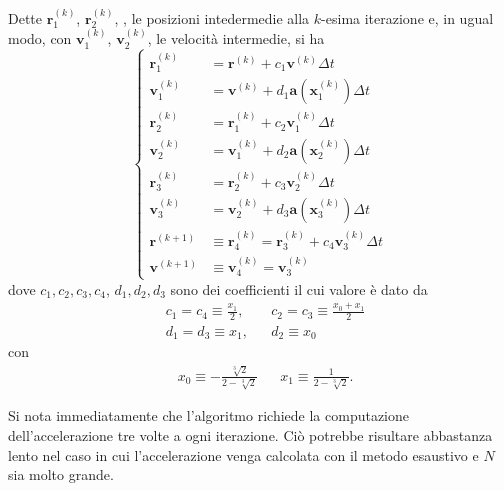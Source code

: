 \documentclass[11pt]{article}
\begin{document}
	\begin{tcolorbox}[breakable,title=Algoritmo di Yoshida (di quarto ordine)]
		Dette $\mathbf{r}^{(k)}_1$, $\mathbf{r}^{(k)}_2$, \textellipsis, le posizioni intedermedie alla $k$-esima iterazione e, in ugual modo, con $\mathbf{v}^{(k)}_1$, $\mathbf{v}^{(k)}_2$, \textellipsis le velocità intermedie, si ha 
		\begin{equation}
			\left\{
			\begin{aligned}
				\mathbf{r}^{(k)}_1 &= \mathbf{r}^{(k)} + c_1\mathbf{v}^{(k)}\Delta t \\
				\mathbf{v}^{(k)}_1 &= \mathbf{v}^{(k)} + d_1 \mathbf{a}(\mathbf{x}^{(k)}_1)\Delta t \\
				\mathbf{r}^{(k)}_2 &= \mathbf{r}^{(k)}_1 + c_2\mathbf{v}^{(k)}_1\Delta t \\
				\mathbf{v}^{(k)}_2 &= \mathbf{v}^{(k)}_1 + d_2 \mathbf{a}(\mathbf{x}^{(k)}_2)\Delta t \\
				\mathbf{r}^{(k)}_3 &= \mathbf{r}^{(k)}_2 + c_3\mathbf{v}^{(k)}_2\Delta t \\
				\mathbf{v}^{(k)}_3 &= \mathbf{v}^{(k)}_2 + d_3 \mathbf{a}(\mathbf{x}^{(k)}_3)\Delta t \\
				\mathbf{r}^{(k + 1)} &\equiv \mathbf{r}^{(k)}_4 = \mathbf{r}^{(k)}_3 + c_4\mathbf{v}^{(k)}_3\Delta t \\
				\mathbf{v}^{(k + 1)} &\equiv \mathbf{v}^{(k)}_4 = \mathbf{v}^{(k)}_3
			\end{aligned}
			\right.
		\end{equation}
		dove $c_1, c_2, c_3, c_4$, $d_1, d_2, d_3$ sono dei coefficienti il cui valore è dato da 
		\begin{equation*}
			\begin{aligned}
				&c_1 = c_4 \equiv \frac{x_1}{2},& &c_2 = c_3 \equiv \frac{x_0 + x_1}{2} \\
				&d_1 = d_3 \equiv x_1, & &d_2 \equiv x_0
			\end{aligned}
		\end{equation*}
		con 
		\begin{equation*}
			\begin{aligned}
				&x_0 \equiv -\frac{\sqrt[3]{2}}{2 - \sqrt[3]{2}} & &x_1 \equiv \frac{1}{2 - \sqrt[3]{2}}.
			\end{aligned}
		\end{equation*}
	\end{tcolorbox}

	Si nota immediatamente che l'algoritmo richiede la computazione dell'accelerazione tre volte a ogni iterazione. Ciò potrebbe risultare abbastanza lento nel caso in cui l'accelerazione venga calcolata con il metodo esaustivo e $N$ sia molto grande.
\end{document}
